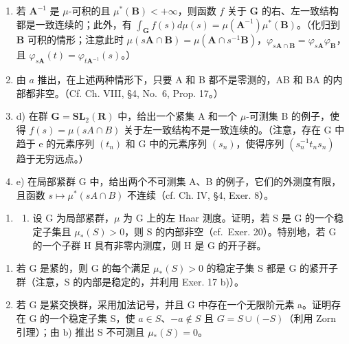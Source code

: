 \begin{enumerate}
\def\labelenumi{\alph{enumi})}
\setcounter{enumi}{1}
\item
  若 \(\mathbf{A}^{-1}\) 是 \(\mu\)-可积的且 \(\mu^{*}(\mathbf{B}) < +\infty\)，则函数 \(f\) 关于 \(\mathbf{G}\) 的右、左一致结构都是一致连续的；此外，有 \(\int_{\mathbf{G}} f(s) d\mu(s) = \mu(\mathbf{A}^{-1})\mu^{*}(\mathbf{B})\)。（化归到 \(\mathbf{B}\) 可积的情形；注意此时 \(\mu(s\mathbf{A} \cap \mathbf{B}) = \mu(\mathbf{A} \cap s^{-1}\mathbf{B})\)，\(\varphi_{s\mathbf{A} \cap \mathbf{B}} = \varphi_{s\mathbf{A}}\varphi_{\mathbf{B}}\)，且 \(\varphi_{s\mathbf{A}}(t) = \varphi_{t\mathbf{A}^{-1}}(s)\)。）
\item
  由 \(a\) 推出，在上述两种情形下，只要 A 和 B 都不是零测的，AB 和 BA 的内部都非空。（Cf. Ch. VIII, §4, No.~6, Prop. 17。）
\item
  d) 在群 \(\mathbf{G} = \mathbf{SL}_{2}(\mathbf{R})\) 中，给出一个紧集 A 和一个 \(\mu\)-可测集 B 的例子，使得 \(f(s) = \mu(sA \cap B)\) 关于左一致结构不是一致连续的。（注意，存在 G 中趋于 e 的元素序列 \((t_{n})\) 和 G 中的元素序列 \((s_{n})\)，使得序列 \((s_{n}^{-1}t_{n}s_{n})\) 趋于无穷远点。）
\item
  e) 在局部紧群 G 中，给出两个不可测集 A、B 的例子，它们的外测度有限，且函数 \(s \mapsto \mu^{*}(sA \cap B)\) 不连续（cf. Ch. IV, §4, Exer. 8）。
\end{enumerate}

\begin{enumerate}
\def\labelenumi{\arabic{enumi})}
\setcounter{enumi}{20}
\tightlist
\item
  \begin{enumerate}
  \def\labelenumii{\alph{enumii})}
  \tightlist
  \item
    设 G 为局部紧群，\(\mu\) 为 G 上的左 Haar 测度。证明，若 S 是 G 的一个稳定子集且 \(\mu_{*}(S)>0\)，则 S 的内部非空（cf.~Exer. 20）。特别地，若 G 的一个子群 H 具有非零内测度，则 H 是 G 的开子群。
  \end{enumerate}
\end{enumerate}

\begin{enumerate}
\def\labelenumi{\alph{enumi})}
\setcounter{enumi}{1}
\item
  若 G 是紧的，则 G 的每个满足 \(\mu_{*}(S) > 0\) 的稳定子集 S 都是 G 的紧开子群（注意，S 的内部是稳定的，并利用 Exer. 17 b)）。
\item
若 G 是紧交换群，采用加法记号，并且 G 中存在一个无限阶元素 a。证明存在 G 的一个稳定子集 S，使 \(a \in S\)、\(-a \notin S\) 且 \(G = S \cup (-S)\)（利用 Zorn 引理）；由 b) 推出 S 不可测且 \(\mu_{*}(S) = 0\)。
\end{enumerate}

